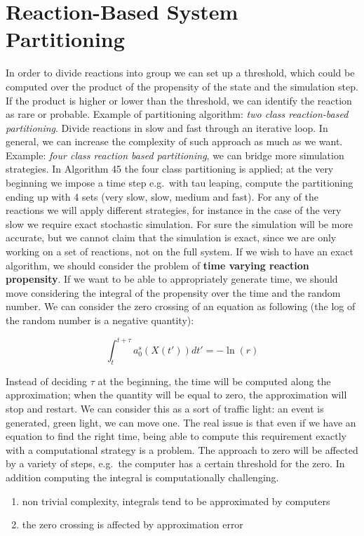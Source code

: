 \section{Reaction-Based System Partitioning}
In order to divide reactions into group we can set up a threshold, which could be computed over the product of the propensity of the state and the simulation step.
If the product is higher or lower than the threshold, we can identify the reaction as rare or probable.
Example of partitioning algorithm: \emph{two class reaction-based partitioning}.
Divide reactions in slow and fast through an iterative loop.
In general, we can increase the complexity of such approach as much as we want.
Example: \emph{four class reaction based partitioning}, we can bridge more simulation strategies.
In Algorithm 45 the four class partitioning is applied; at the very beginning we impose a time step e.g.~with tau leaping, compute the partitioning ending up with 4 sets (very slow, slow, medium and fast).
For any of the reactions we will apply different strategies, for instance in the case of the very slow we require exact stochastic simulation.
For sure the simulation will be more accurate, but we cannot claim that the simulation is exact, since we are only working on a set of reactions, not on the full system.
If we wish to have an exact algorithm, we should consider the problem of \textbf{time varying reaction propensity}.
If we want to be able to appropriately generate time, we should move considering the integral of the propensity over the time and the random number.
We can consider the zero crossing of an equation as following (the log of the random number is a negative quantity):

$$\int_t^{t+\tau}a_0^s (X(t')) dt' = - \ln(r)$$

Instead of deciding $\tau$ at the beginning, the time will be computed along the approximation; when the quantity will be equal to zero, the approximation will stop and restart.
We can consider this as a sort of traffic light: an event is generated, green light, we can move one.
The real issue is that even if we have an equation to find the right time, being able to compute this requirement exactly with a computational strategy is a problem.
The approach to zero will be affected by a variety of steps, e.g.~the computer has a certain threshold for the zero.
In addition computing the integral is computationally challenging.

\begin{enumerate}
  \def\labelenumi{\arabic{enumi}.}
  \item non trivial complexity, integrals tend to be approximated by computers
  \item the zero crossing is affected by approximation error
\end{enumerate}

